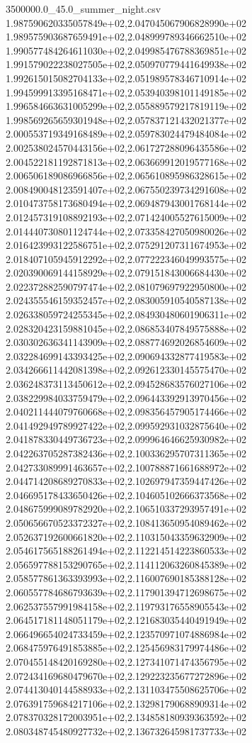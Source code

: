 \begin{filecontents*}{3500000.0_45.0_summer_night.csv}
1.987590620335057849e+02,2.047045067906828990e+02
1.989575903687659491e+02,2.048999789346662510e+02
1.990577484264611030e+02,2.049985476788369851e+02
1.991579022238027505e+02,2.050970779441649938e+02
1.992615015082704133e+02,2.051989578346710914e+02
1.994599913395168471e+02,2.053940398101149185e+02
1.996584663631005299e+02,2.055889579217819119e+02
1.998569265659301948e+02,2.057837121432021377e+02
2.000553719349168489e+02,2.059783024479484084e+02
2.002538024570443156e+02,2.061727288096435586e+02
2.004522181192871813e+02,2.063669912019577168e+02
2.006506189086966856e+02,2.065610895986328615e+02
2.008490048123591407e+02,2.067550239734291608e+02
2.010473758173680494e+02,2.069487943001768144e+02
2.012457319108892193e+02,2.071424005527615009e+02
2.014440730801124744e+02,2.073358427050980026e+02
2.016423993122586751e+02,2.075291207311674953e+02
2.018407105945912292e+02,2.077222346049993575e+02
2.020390069144158929e+02,2.079151843006684430e+02
2.022372882590797474e+02,2.081079697922950800e+02
2.024355546159352457e+02,2.083005910540587138e+02
2.026338059724255345e+02,2.084930480601906311e+02
2.028320423159881045e+02,2.086853407849575888e+02
2.030302636341143909e+02,2.088774692026854609e+02
2.032284699143393425e+02,2.090694332877419583e+02
2.034266611442081398e+02,2.092612330145575470e+02
2.036248373113450612e+02,2.094528683576027106e+02
2.038229984033759479e+02,2.096443392913970456e+02
2.040211444079760668e+02,2.098356457905174466e+02
2.041492949789927422e+02,2.099592931032875640e+02
2.041878330449736723e+02,2.099964646625930982e+02
2.042263705287382436e+02,2.100336295707311365e+02
2.042733089991463657e+02,2.100788871661688972e+02
2.044714208689270833e+02,2.102697947359447426e+02
2.046695178433650426e+02,2.104605102666373568e+02
2.048675999089782920e+02,2.106510337293957491e+02
2.050656670523372327e+02,2.108413650954089462e+02
2.052637192600661820e+02,2.110315043359632909e+02
2.054617565188261494e+02,2.112214514223860533e+02
2.056597788153290765e+02,2.114112063260845389e+02
2.058577861363393993e+02,2.116007690185388128e+02
2.060557784686793639e+02,2.117901394712698675e+02
2.062537557991984158e+02,2.119793176558905543e+02
2.064517181148051179e+02,2.121683035440491949e+02
2.066496654024733459e+02,2.123570971074886984e+02
2.068475976491853885e+02,2.125456983179974486e+02
2.070455148420169280e+02,2.127341071474356795e+02
2.072434169680479670e+02,2.129223235677272896e+02
2.074413040144588933e+02,2.131103475508625706e+02
2.076391759684217106e+02,2.132981790688909314e+02
2.078370328172003951e+02,2.134858180939363592e+02
2.080348745480927732e+02,2.136732645981737733e+02

\end{filecontents*}
